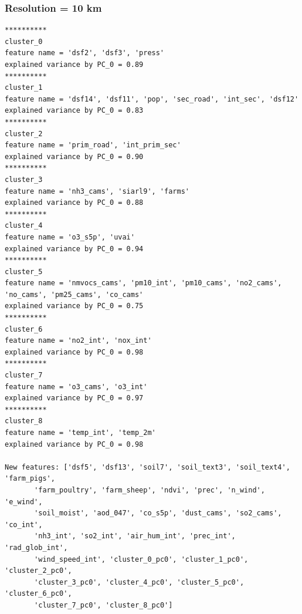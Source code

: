 \subsubsection{Resolution = 10 km}
\begin{verbatim}
**********
cluster_0
feature name = 'dsf2', 'dsf3', 'press'
explained variance by PC_0 = 0.89
**********
cluster_1
feature name = 'dsf14', 'dsf11', 'pop', 'sec_road', 'int_sec', 'dsf12'
explained variance by PC_0 = 0.83
**********
cluster_2
feature name = 'prim_road', 'int_prim_sec'
explained variance by PC_0 = 0.90
**********
cluster_3
feature name = 'nh3_cams', 'siarl9', 'farms'
explained variance by PC_0 = 0.88
**********
cluster_4
feature name = 'o3_s5p', 'uvai'
explained variance by PC_0 = 0.94
**********
cluster_5
feature name = 'nmvocs_cams', 'pm10_int', 'pm10_cams', 'no2_cams', 'no_cams', 'pm25_cams', 'co_cams'
explained variance by PC_0 = 0.75
**********
cluster_6
feature name = 'no2_int', 'nox_int'
explained variance by PC_0 = 0.98
**********
cluster_7
feature name = 'o3_cams', 'o3_int'
explained variance by PC_0 = 0.97
**********
cluster_8
feature name = 'temp_int', 'temp_2m'
explained variance by PC_0 = 0.98

New features: ['dsf5', 'dsf13', 'soil7', 'soil_text3', 'soil_text4', 'farm_pigs',
       'farm_poultry', 'farm_sheep', 'ndvi', 'prec', 'n_wind', 'e_wind',
       'soil_moist', 'aod_047', 'co_s5p', 'dust_cams', 'so2_cams', 'co_int',
       'nh3_int', 'so2_int', 'air_hum_int', 'prec_int', 'rad_glob_int',
       'wind_speed_int', 'cluster_0_pc0', 'cluster_1_pc0', 'cluster_2_pc0',
       'cluster_3_pc0', 'cluster_4_pc0', 'cluster_5_pc0', 'cluster_6_pc0',
       'cluster_7_pc0', 'cluster_8_pc0']
\end{verbatim}
